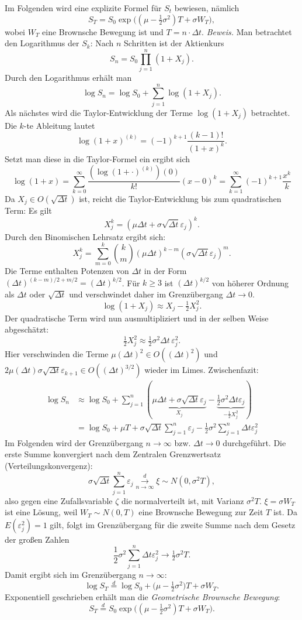 Im Folgenden wird eine explizite Formel für $S_t$ bewiesen, nämlich
$$S_T = S_0 \exp\!\Big( (\mu - \tfrac12 \sigma^2)T + \sigma W_T \Big),$$
wobei $W_T$ eine Brownsche Bewegung ist und $T=n \cdot \Delta t$. \textit{Beweis.}
Man betrachtet den Logarithmus der $S_k$: Nach $n$ Schritten ist der Aktienkurs
$$
S_n = S_0 \prod_{j=1}^n (1 + X_j).
$$
Durch den Logarithmus erhält man
$$
\log S_n = \log S_0 + \sum_{j=1}^n \log(1+X_j).
$$
Als nächstes wird die Taylor-Entwicklung der Terme $\log(1+X_j)$ betrachtet. Die $k$-te Ableitung lautet
$$\log(1+x)^{(k)}=(-1)^{k+1} \frac{(k-1)!}{(1+x)^k}.$$
Setzt man diese in die Taylor-Formel ein ergibt sich
$$\log(1+x) = \sum_{k=0}^{\infty} \frac{(\log(1+\cdot)^{(k)})(0)}{k!}(x-0)^k= \sum_{k=1}^\infty(-1)^{k+1} \frac{x^k}{k}$$
Da $X_j \in O(\sqrt{\Delta t})$ ist, reicht die Taylor-Entwicklung bis zum quadratischen Term: Es gilt
$$
X_j^k = (\mu \Delta t + \sigma \sqrt{\Delta t} \varepsilon_j)^k.
$$
Durch den Binomischen Lehrsatz ergibt sich:
$$
X_j^k = \sum_{m=0}^k \binom{k}{m} (\mu \Delta t)^{k-m} (\sigma \sqrt{\Delta t} \varepsilon_j)^m.
$$
Die Terme enthalten Potenzen von $\Delta t$ in der Form $(\Delta t)^{(k-m)/2 + m/2} = (\Delta t)^{k/2}$. Für $k \geq 3$ ist $(\Delta t)^{k/2}$ von höherer Ordnung als $\Delta t$ oder $\sqrt{\Delta t}$ und verschwindet daher im Grenzübergang $\Delta t \to 0$.
$$
\log(1+X_j) \approx X_j - \tfrac12 X_j^2.
$$
Der quadratische Term wird nun ausmultipliziert und in der selben Weise abgeschätzt:
$$
\tfrac12 X_j^2 \approx \tfrac12 \sigma^2 \Delta t \,\varepsilon_j^2.
$$
Hier verschwinden die Terme $\mu (\Delta t)^2 \in O((\Delta t)^{2})$ und $2 \mu (\Delta t) \sigma \sqrt{\Delta t} \varepsilon_{k+1} \in O((\Delta t)^{3/2})$ wieder im Limes. Zwischenfazit:
$$
\begin{aligned}
\log S_n &\approx \log S_0 + \sum_{j=1}^n\left( \underbrace{\mu \Delta t + \sigma\sqrt{\Delta t} \varepsilon_j}_{X_j} - \underbrace{\frac{1}{2} \sigma^2 \Delta t \varepsilon_j}_{-\frac{1}{2} X_j^2} \right)
\\ &= \log S_0 + \mu T + \sigma\sqrt{\Delta t} \sum_{j=1}^{n} \varepsilon_j - \frac{1}{2} \sigma^2 \sum_{j=1}^{n} \Delta t \varepsilon_j^2 
\end{aligned}
$$
Im Folgenden wird der Grenzübergang $n \longrightarrow \infty$ bzw. $\Delta t \longrightarrow 0$ durchgeführt. 
Die erste Summe konvergiert nach dem Zentralen Grenzwertsatz (Verteilungskonvergenz):
$$
\sigma \sqrt{\Delta t} \sum_{j=1}^n \varepsilon_j \overset{d}{\underset{n \to \infty}{\longrightarrow}} \xi \sim N(0, \sigma^2 T),
$$
also gegen eine Zufallsvariable $\zeta$ die normalverteilt ist, mit Varianz $\sigma^2 T$.  $\xi = \sigma W_T$ ist eine Lösung, 
weil $W_T \sim N(0, T)$ eine Brownsche Bewegung zur Zeit $T$ ist. 
Da $E(\varepsilon_j^2) = 1$ gilt, folgt im Grenzübergang für die zweite Summe nach dem Gesetz der großen Zahlen
$$
\frac{1}{2} \sigma^2 \sum_{j=1}^{n} \Delta t \varepsilon_j^2  \longrightarrow \tfrac12 \sigma^2 T.
$$
Damit ergibt sich im Grenzübergang $n \to \infty$:
$$
\log S_T \overset{d} = \log S_0 + \big(\mu - \tfrac12 \sigma^2\big)T + \sigma W_T.
$$Exponentiell geschrieben erhält man die \textit{Geometrische Brownsche Bewegung}:
$$
S_T \overset d = S_0 \exp\!\Big( (\mu - \tfrac12 \sigma^2)T + \sigma W_T \Big).
$$

